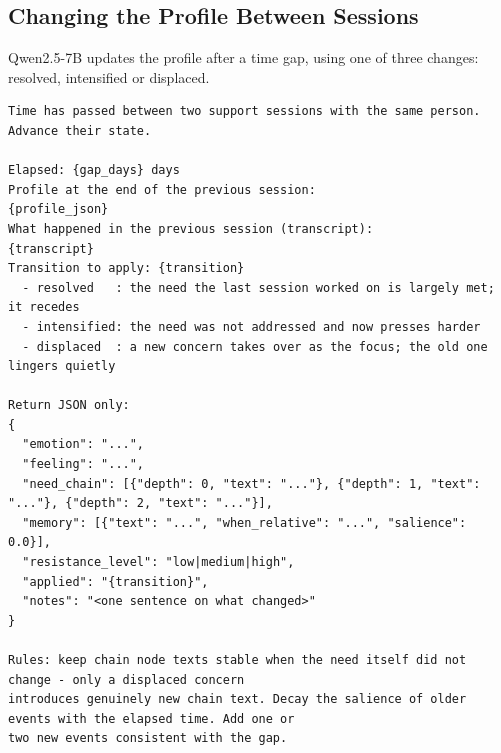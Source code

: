 \documentclass[journal]{IEEEtran}
\begin{document}
\subsection{Changing the Profile Between Sessions}
Qwen2.5-7B updates the profile after a time gap, using one of three changes: resolved, intensified or displaced.
\begin{lstlisting}
Time has passed between two support sessions with the same person. Advance their state.

Elapsed: {gap_days} days
Profile at the end of the previous session:
{profile_json}
What happened in the previous session (transcript):
{transcript}
Transition to apply: {transition}
  - resolved   : the need the last session worked on is largely met; it recedes
  - intensified: the need was not addressed and now presses harder
  - displaced  : a new concern takes over as the focus; the old one lingers quietly

Return JSON only:
{
  "emotion": "...",
  "feeling": "...",
  "need_chain": [{"depth": 0, "text": "..."}, {"depth": 1, "text": "..."}, {"depth": 2, "text": "..."}],
  "memory": [{"text": "...", "when_relative": "...", "salience": 0.0}],
  "resistance_level": "low|medium|high",
  "applied": "{transition}",
  "notes": "<one sentence on what changed>"
}

Rules: keep chain node texts stable when the need itself did not change - only a displaced concern
introduces genuinely new chain text. Decay the salience of older events with the elapsed time. Add one or
two new events consistent with the gap.
\end{lstlisting}
\end{document}
